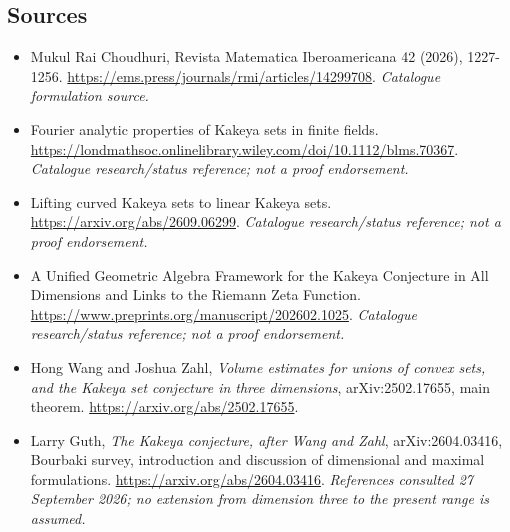 \documentclass[11pt,a4paper]{article}
\numberwithin{equation}{section}
\begin{document}
\subsection{Sources}
\begin{itemize}\raggedright
\item[\textnormal{[S1]}]\hypertarget{source:30006573:1}{} Mukul Rai Choudhuri, Revista Matematica Iberoamericana 42 (2026), 1227-1256.
\url{https://ems.press/journals/rmi/articles/14299708}.
{\small\textit{Catalogue formulation source.}}
\item[\textnormal{[S2]}]\hypertarget{source:30006573:2}{} Fourier analytic properties of Kakeya sets in finite fields.
\url{https://londmathsoc.onlinelibrary.wiley.com/doi/10.1112/blms.70367}.
{\small\textit{Catalogue research/status reference; not a proof endorsement.}}
\item[\textnormal{[S3]}]\hypertarget{source:30006573:3}{} Lifting curved Kakeya sets to linear Kakeya sets.
\url{https://arxiv.org/abs/2609.06299}.
{\small\textit{Catalogue research/status reference; not a proof endorsement.}}
\item[\textnormal{[S4]}]\hypertarget{source:30006573:4}{} A Unified Geometric Algebra Framework for the Kakeya Conjecture in All Dimensions and Links to the Riemann Zeta Function.
\url{https://www.preprints.org/manuscript/202602.1025}.
{\small\textit{Catalogue research/status reference; not a proof endorsement.}}
\item[\textnormal{[E1]}]\hypertarget{extra:30006573:1}{} Hong Wang and Joshua Zahl,
\emph{Volume estimates for unions of convex sets, and the Kakeya set conjecture in three dimensions}, arXiv:2502.17655, main theorem.
\url{https://arxiv.org/abs/2502.17655}.
\item[\textnormal{[E2]}]\hypertarget{extra:30006573:2}{} Larry Guth,
\emph{The Kakeya conjecture, after Wang and Zahl}, arXiv:2604.03416,
Bourbaki survey, introduction and discussion of dimensional and maximal formulations.
\url{https://arxiv.org/abs/2604.03416}.
{\small\textit{References consulted 27 September 2026; no extension from dimension three to the present range is assumed.}}

\end{itemize}

\end{document}
